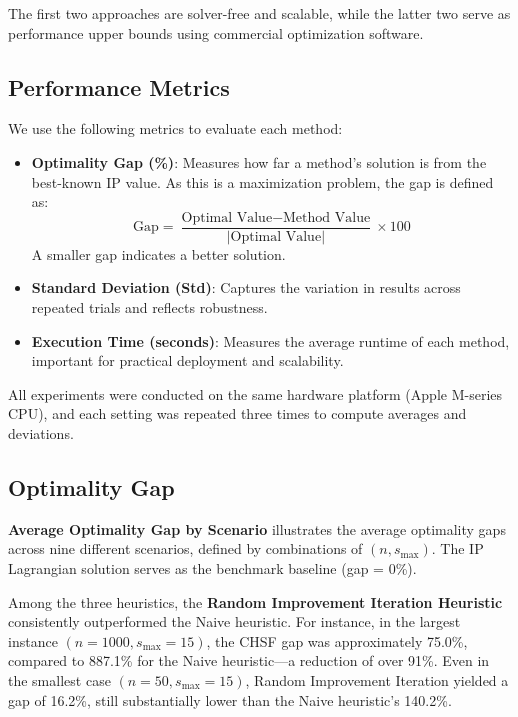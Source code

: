 The first two approaches are solver-free and scalable, while the latter two serve as performance upper bounds using commercial optimization software.

\subsection{Performance Metrics}

We use the following metrics to evaluate each method:

\begin{itemize}
    \item \textbf{Optimality Gap (\%)}: Measures how far a method's solution is from the best-known IP value. As this is a maximization problem, the gap is defined as:
    \[
    \text{Gap} = \frac{\text{Optimal Value} - \text{Method Value}}{|\text{Optimal Value}|} \times 100
    \]
    A smaller gap indicates a better solution.
    
    \item \textbf{Standard Deviation (Std)}: Captures the variation in results across repeated trials and reflects robustness.
    
    \item \textbf{Execution Time (seconds)}: Measures the average runtime of each method, important for practical deployment and scalability.
\end{itemize}

All experiments were conducted on the same hardware platform (Apple M-series CPU), and each setting was repeated three times to compute averages and deviations.

\subsection{Optimality Gap}

\textbf{Average Optimality Gap by Scenario} illustrates the average optimality gaps across nine different scenarios, defined by combinations of $(n, s_{\max})$. The IP Lagrangian solution serves as the benchmark baseline (gap = 0\%). 

Among the three heuristics, the \textbf{Random Improvement Iteration Heuristic} consistently outperformed the Naive heuristic. For instance, in the largest instance $(n=1000, s_{\max}=15)$, the CHSF gap was approximately 75.0\%, compared to 887.1\% for the Naive heuristic—a reduction of over 91\%. Even in the smallest case $(n=50, s_{\max}=15)$, Random Improvement Iteration yielded a gap of 16.2\%, still substantially lower than the Naive heuristic's 140.2\%.

